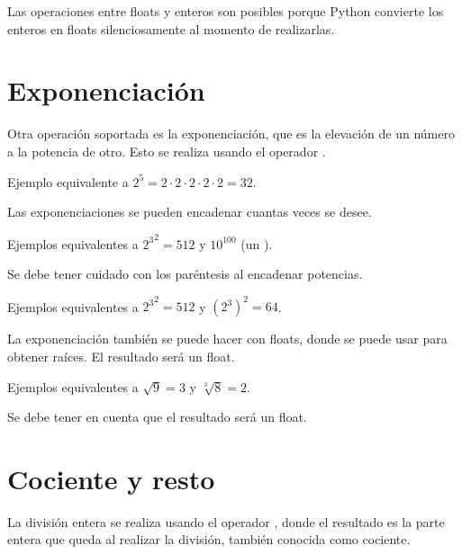 
Las operaciones entre floats y enteros son posibles porque Python convierte los enteros en floats silenciosamente al momento de realizarlas.

\section{Exponenciación}

Otra operación soportada es la exponenciación, que es la elevación de un número a la potencia de otro. Esto se realiza usando el operador \ttt{**}.\smallskip

Ejemplo equivalente a $2 ^ 5 = 2\cdot 2\cdot 2\cdot 2\cdot 2 = 32$.


Las exponenciaciones se pueden encadenar cuantas veces se desee.\smallskip

Ejemplos equivalentes a ${2 ^ 3} ^ 2 = 512$ y $10 ^ {100}$ (un ).


Se debe tener cuidado con los paréntesis al encadenar potencias.\smallskip

Ejemplos equivalentes a ${2 ^ 3} ^ 2 = 512$ y $(2 ^ 3) ^ 2 = 64$.


La exponenciación también se puede hacer con floats, donde se puede usar para obtener raíces. El resultado será un float.\smallskip

Ejemplos equivalentes a $\sqrt{9} = 3$ y $\sqrt[3]{8} = 2$.


Se debe tener en cuenta que el resultado será un float.

\section{Cociente y resto}


La división entera se realiza usando el operador \ttt{//}, donde el resultado es la parte entera que queda al realizar la división, también conocida como cociente.\smallskip

